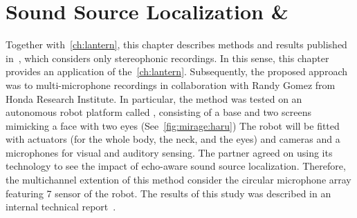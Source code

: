 \chapter{Sound Source Localization \& }\label{chap:mirage}


 \synopsisChMirage

\mynewline
Together with~\cref{ch:lantern}, this chapter describes methods and results published in~\cite{di2019mirage}, which considers only stereophonic recordings.
In this sense, this chapter provides an application of the~\cref{ch:lantern}.
Subsequently, the proposed approach was to multi-microphone recordings in collaboration with Randy Gomez from Honda Research Institute.
In particular, the method was tested on an autonomous robot platform called , consisting of a base and two screens mimicking a face with two eyes (See~\cref{fig:mirage:haru})
The robot will be fitted with actuators (for the whole body, the neck, and the eyes) and cameras and a microphones for visual and auditory sensing.
The partner agreed on using its technology to see the impact of echo-aware sound source localization.
Therefore, the multichannel extention of this method consider the circular microphone array featuring 7 sensor of the  robot.
The results of this study was described in an internal technical report~.


